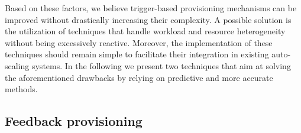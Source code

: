 Based on these factors, we believe trigger-based provisioning mechanisms can 
be improved without drastically increasing their complexity. A possible 
solution is the utilization of techniques that handle workload and resource
heterogeneity without being excessively reactive. Moreover, the implementation 
of these techniques should remain simple to facilitate their integration in 
existing auto-scaling systems. In the following we present two techniques 
that aim at solving the aforementioned drawbacks by relying on predictive 
and more accurate methods.







\subsection*{Feedback provisioning}




